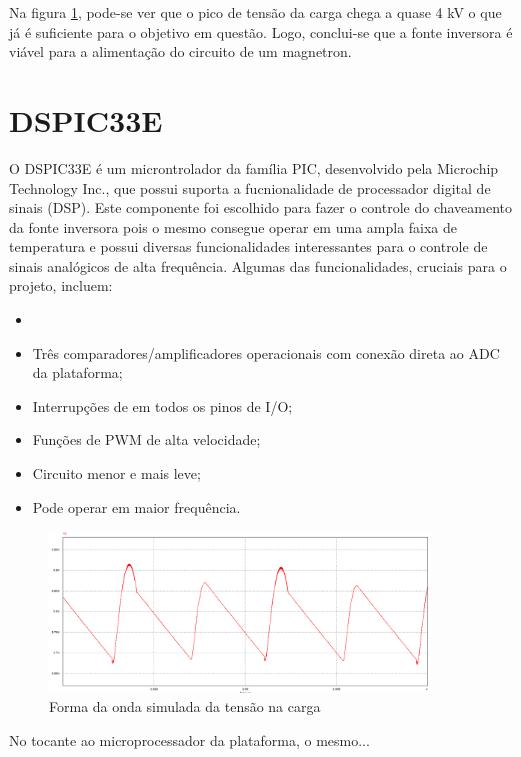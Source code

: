 Na figura \ref{fig:figura-graf_sim_1}, pode-se ver que o pico de tensão da carga chega a quase 4 kV o que já é suficiente para o objetivo em questão. Logo, conclui-se que a fonte inversora é viável para a alimentação do circuito de um magnetron.

\section{DSPIC33E}
\label{sec:dsPIC}

O DSPIC33E é um microntrolador da família PIC, desenvolvido pela Microchip Technology Inc., que possui suporta a fucnionalidade de processador digital de sinais (DSP). Este componente foi escolhido para fazer o controle do chaveamento da fonte inversora pois o mesmo consegue operar em uma ampla faixa de temperatura e possui diversas funcionalidades interessantes para o controle de sinais analógicos de alta frequência. Algumas das funcionalidades, cruciais para o projeto, incluem:
\begin{itemize}
    \item
    \item Três comparadores/amplificadores operacionais com conexão direta ao ADC da plataforma;
    \item Interrupções de  em todos os pinos de I/O;
    \item Funções de PWM de alta velocidade;
    \item Circuito menor e mais leve;
    \item Pode operar em maior frequência.
\end{itemize} 

\begin{figure}[!htb]
    \centering
    \includegraphics[width=0.9\textwidth]{./dados/figuras/psim2}
    \caption{Forma da onda simulada da tensão na carga}
    \label{fig:figura-graf_sim_1}
\end{figure}

No tocante ao microprocessador da plataforma, o mesmo...




